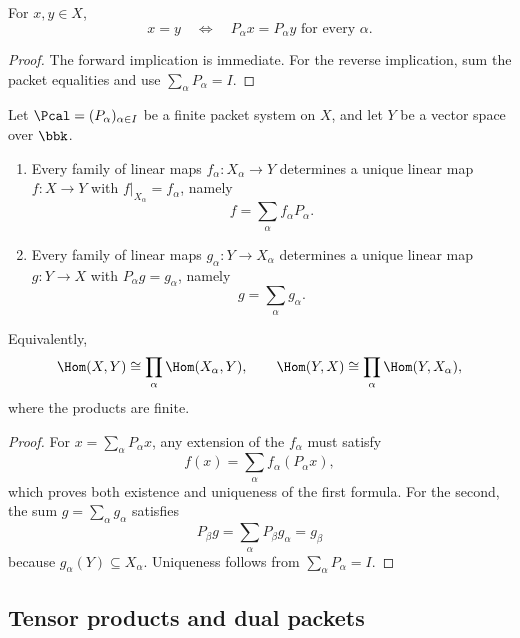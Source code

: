 \begin{corollary}
\label{cor:packetwise-equality}
For $x,y\in X$,
\[
x=y
\quad\Longleftrightarrow\quad
P_\alpha x=P_\alpha y\text{ for every }\alpha.
\]
\end{corollary}

\begin{proof}
The forward implication is immediate.  For the reverse implication, sum the packet equalities and use $\sum_\alpha P_\alpha=I$.
\end{proof}



\begin{corollary}
\label{cor:packet-universal-property}
Let \(\Pcal=(P_\alpha)_{\alpha\in I}\) be a finite packet system on \(X\), and let \(Y\) be a vector space over \(\bbk\).
\begin{enumerate}
\item Every family of linear maps \(f_\alpha:X_\alpha\to Y\) determines a unique linear map \(f:X\to Y\) with \(f|_{X_\alpha}=f_\alpha\), namely
\[
f=\sum_\alpha f_\alpha P_\alpha.
\]
\item Every family of linear maps \(g_\alpha:Y\to X_\alpha\) determines a unique linear map \(g:Y\to X\) with \(P_\alpha g=g_\alpha\), namely
\[
g=\sum_\alpha g_\alpha.
\]
\end{enumerate}
Equivalently,
\[
\Hom(X,Y)\cong\prod_\alpha\Hom(X_\alpha,Y),
\qquad
\Hom(Y,X)\cong\prod_\alpha\Hom(Y,X_\alpha),
\]
where the products are finite.
\end{corollary}

\begin{proof}
For \(x=\sum_\alpha P_\alpha x\), any extension of the \(f_\alpha\) must satisfy
\[
f(x)=\sum_\alpha f_\alpha(P_\alpha x),
\]
which proves both existence and uniqueness of the first formula.  For the second, the sum \(g=\sum_\alpha g_\alpha\) satisfies
\[
P_\beta g
=\sum_\alpha P_\beta g_\alpha
=g_\beta
\]
because \(g_\alpha(Y)\subseteq X_\alpha\).  Uniqueness follows from \(\sum_\alpha P_\alpha=I\).
\end{proof}


\subsection{Tensor products and dual packets}


